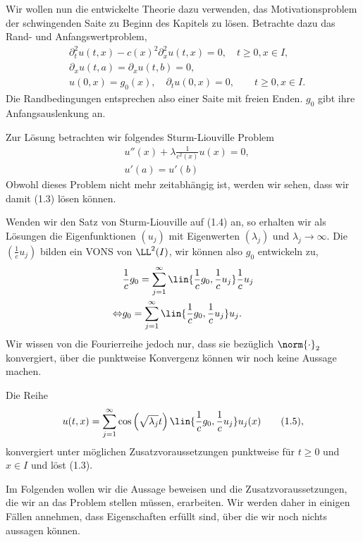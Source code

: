 Wir wollen nun die entwickelte Theorie dazu verwenden, das Motivationsproblem
der schwingenden Saite zu Beginn des Kapitels zu lösen. Betrachte dazu das
Rand- und Anfangswertproblem,
\begin{align*}
&\partial_t^2 u(t,x) - c(x)^2\partial_x^2u(t,x) = 0,\quad t\ge 0, x\in
I,\tag{1.3}\\
&\partial_x u(t,a) = \partial_x u(t,b) = 0,\\
&u(0,x) = g_0(x),\quad \partial_t u(0,x) = 0,\qquad t\ge 0, x\in I.
\end{align*}
Die Randbedingungen entsprechen also einer Saite mit freien Enden. $g_0$
gibt ihre Anfangsauslenkung an.

Zur Lösung betrachten wir folgendes Sturm-Liouville Problem
\begin{align*}
&u''(x) + \lambda\frac{1}{c^2(x)}u(x) = 0,\tag{1.4}\\
&u'(a) = u'(b)
\end{align*}
Obwohl dieses Problem nicht mehr zeitabhängig ist, werden wir sehen, dass wir
damit (1.3) lösen können.

Wenden wir den Satz von Sturm-Liouville auf (1.4) an, so erhalten wir als
Lösungen die Eigenfunktionen $(u_j)$ mit Eigenwerten $(\lambda_j)$ und
$\lambda_j\to\infty$. Die $(\frac{1}{c}u_j)$ bilden ein VONS von $\LL^2(I)$,
wir können also $g_0$ entwickeln zu,
\begin{align*}
&\frac{1}{c}g_0 = \sum\limits_{j=1}^\infty
\lin{\frac{1}{c}g_0,\frac{1}{c}u_j}\frac{1}{c}u_j\\
\Leftrightarrow & g_0 = \sum\limits_{j=1}^\infty
\lin{\frac{1}{c}g_0,\frac{1}{c}u_j}u_j.
\end{align*}
Wir wissen von die Fourierreihe jedoch nur, dass sie bezüglich $\norm{\cdot}_2$
konvergiert, über die punktweise Konvergenz können wir noch keine Aussage
machen.

\begin{propn}[Proposition]
Die Reihe
\begin{align*}
u(t,x) = \sum\limits_{j=1}^\infty
\cos\left(\sqrt{\lambda_j}t\right)\lin{\frac{1}{c}g_0,\frac{1}{c}u_j}u_j(x)\tag{1.5},
\end{align*}
konvergiert unter möglichen Zusatzvoraussetzungen punktweise für $t\ge 0$ und
$x\in I$ und löst (1.3).\fishhere
\end{propn}

Im Folgenden wollen wir die Aussage beweisen und die Zusatzvoraussetzungen,
die wir an das Problem stellen müssen, erarbeiten. Wir werden daher in einigen
Fällen annehmen, dass Eigenschaften erfüllt sind, über die wir noch nichts
aussagen können.

